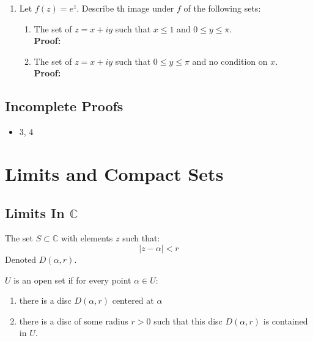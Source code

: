 \begin{enumerate}
	\item Let $f(z) = e^z.$ Describe th image under $f$ of the following sets:
	\begin{enumerate}
		\item The set of $z = x + iy$ such that $x \leq 1$ and $0 \leq y \leq \pi.$ \\
		
		\textbf{Proof:} \\

		\item The set of $z = x + iy$ such that $0 \leq y \leq \pi$ and no condition on $x.$ \\
		
		\textbf{Proof:} \\

	\end{enumerate}
	
\end{enumerate}

\subsection{Incomplete Proofs}
\begin{itemize}
	\item 3, 4
\end{itemize}


\section{Limits and Compact Sets}
\subsection{Limits In $\mathbb{C}$}

\begin{defn}
	The set $S \subset \mathbb{C}$ with elements $z$ such that:
	\[ |z - \alpha | < r \]
	Denoted $D(\alpha, r).$
\end{defn}

\begin{defn}
	$U$ is an open set if for every point $\alpha \in U$:
	\begin{enumerate}
		\item there is a disc $D(\alpha,r)$ centered at $\alpha$
		\item there is a disc of some radius $r > 0$ such that this disc $D(\alpha, r)$ is contained in $U.$
	\end{enumerate}
\end{defn}

